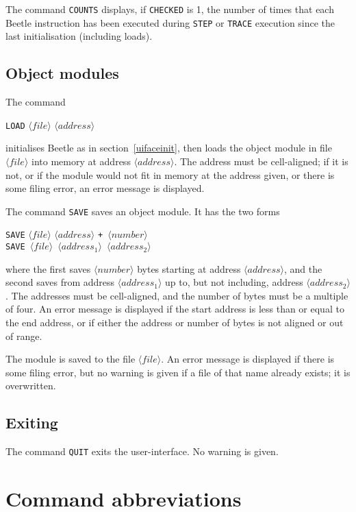 \documentclass{article}
\newcommand{\angb}[1]{$\langle #1\rangle$}
\begin{document}
The command {\tt COUNTS} displays, if {\tt CHECKED} is 1, the number of times
that each Beetle instruction has been executed during {\tt STEP} or {\tt TRACE} execution since the last initialisation
(including loads).

\subsection{Object modules}

The command

\label{uifaceload}
\begin{center}{\tt LOAD} \angb{file} \angb{address}\end{center}

initialises Beetle as in section~\ref{uifaceinit}, then loads the object
module in file \angb{file} into memory at address \angb{address}. The address
must be cell-aligned; if it is not, or if the module would not fit in memory
at the address given, or there is some filing error, an error message is
displayed.

The command {\tt SAVE} saves an object module. It has the two forms

\begin{center}
{\tt SAVE} \angb{file} \angb{address} \tt{+} \angb{number}\\
{\tt SAVE} \angb{file} \angb{address_1} \angb{address_2}
\end{center}

where the first saves \angb{number} bytes starting at address \angb{address},
and the second saves from address \angb{address_1} up to, but not including,
address \angb{address_2}. The addresses must be cell-aligned, and the number
of bytes must be a multiple of four. An error message is displayed if the
start address is less than or equal to the end address, or if either the
address or number of bytes is not aligned or out of range.

The module is saved to the file \angb{file}. An error message is displayed if
there is some filing error, but no warning is given if a file of that name
already exists; it is overwritten.

\subsection{Exiting}

The command {\tt QUIT} exits the user-interface. No warning is given.


\section{Command abbreviations} \label{abbrev}
\end{document}
